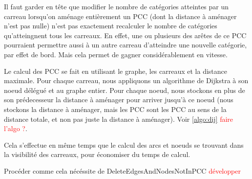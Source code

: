 Il faut garder en tête que modifier le nombre de catégories atteintes par un carreau lorsqu'on aménage entièrement un PCC (dont la distance à aménager n'est pas nulle) n'est pas exactement recalculer le nombre de catégories qu'atteingnent tous les carreaux. En effet, une ou plusieurs des arêtes de ce PCC pourraient permettre aussi à un autre carreau d'atteindre une nouvelle catégorie, par effet de bord. Mais cela permet de gagner considérablement en vitesse.

Le calcul des PCC se fait en utilisant le graphe, les carreaux et la distance maximale. Pour chaque carreau, nous appliquons un algorithme de Dijkstra à son noeud délégué et au graphe entier. Pour chaque noeud, nous stockons en plus de son prédecesseur la distance à aménager pour arriver jusqu'à ce noeud (nous stockons la distance à aménager, mais les PCC sont les PCC au sens de la distance totale, et non pas juste la distance à aménager). Voir \ref{algo:dij} \textcolor{red}{faire l'algo ?}.



Cela s'effectue en même temps que le calcul des arcs et noeuds se trouvant dans la visibilité des carreaux, pour économiser du temps de calcul. 

Procéder comme cela nécéssite de DeleteEdgesAndNodesNotInPCC \textcolor{red}{développer}



